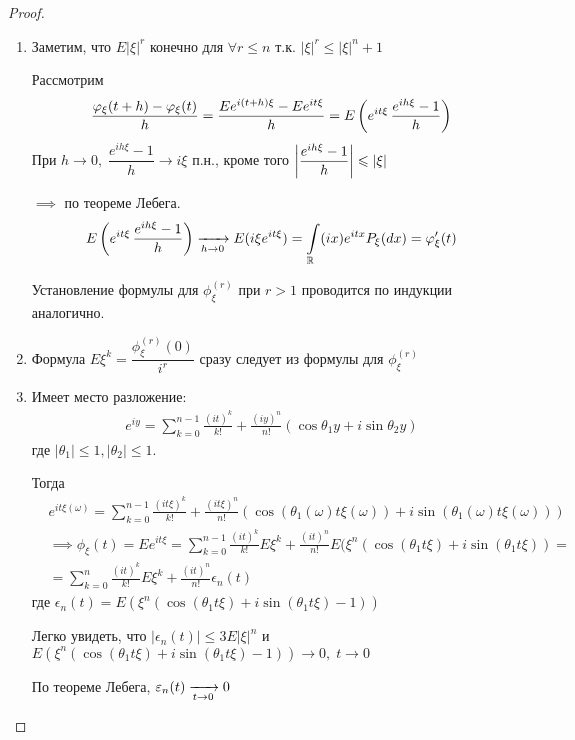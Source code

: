 \begin{proof}~

  \begin{enumerate}
    \item
      Заметим, что $E|\xi|^r$ конечно для $\forall r \leq n$ т.к. $|\xi|^r \leq |\xi|^n + 1$

      Рассмотрим 
      \begin{align*}
        \frac{\varphi_\xi(t + h) - \varphi_\xi (t)}{h} = \frac{E e^{i (t + h) \xi} - E e^{i t \xi}}{h}
        = E \left( e^{i t \xi}\, \frac{e^{i h \xi} - 1}{h} \right)
      \end{align*}
      При $h \to 0, \; \dfrac{e^{i h \xi} - 1}{h} \to i \xi$ п.н., 
      кроме того $\left |  \dfrac{e^{i h \xi} - 1}{h}  \right | \leqslant |\xi|$

      $\implies$ по теореме Лебега.
      \begin{align*}
        E \left( e^{i t \xi}\, \frac{e^{i h \xi} - 1}{h} \right) \xrightarrow[h \to 0]{} E(i \xi e^{i t \xi})
        = \int\limits_{\mathbb{R}} (i x) e^{i t x} P_\xi (dx) = \varphi'_{\xi} (t)
      \end{align*}

      Установление формулы для $\phi_{\xi}^{(r)}$ при $r > 1$ проводится по индукции аналогично.

    \item
      Формула $E \xi^k = \dfrac{\phi_{\xi}^{(r)} (0)}{i^r}$ сразу следует 
      из формулы для $\phi_\xi^{(r)}$

    \item
      Имеет место разложение:
      \begin{align*}
        e^{i y} = \sum_{k = 0}^{n - 1} \frac{(i t)^k}{k!} 
        + \frac{(i y)^n}{n!} (\cos \theta_1 y + i \sin \theta_2 y)
      \end{align*}
      где $|\theta_1| \leq 1, |\theta_2| \leq 1$.

      Тогда 
      \begin{align*}
        &e^{i t \xi(\omega)} = \sum_{k = 0}^{n - 1} \frac{(i t \xi)^k}{k!} 
        + \frac{(i t \xi)^n}{n!} (\cos (\theta_1(\omega) t \xi(\omega)) 
        + i \sin (\theta_1(\omega) t \xi(\omega)))\\
        &\implies \phi_{\xi} (t) = E e^{i t \xi} 
        = \sum_{k = 0}^{n - 1} \frac{(i t)^k}{k!} E \xi^k
        + \frac{(i t)^n}{n!} E (\xi^n (\cos (\theta_1 t \xi) + i \sin (\theta_1 t \xi)) =\\
        &= \sum_{k = 0}^{n} \frac{(i t)^k}{k!} E \xi^k + \frac{(i t)^n}{n!} \epsilon_n (t)
      \end{align*}
      где $\epsilon_n (t) = E (\xi^n (\cos (\theta_1 t \xi) + i \sin (\theta_1 t \xi) - 1))$
      
      Легко увидеть, что $|\epsilon_n (t)| \leq 3 E |\xi|^n$ и
      $E (\xi^n (\cos (\theta_1 t \xi) + i \sin (\theta_1 t \xi) - 1)) \to 0,\; t \to 0$

      По теореме Лебега, $\varepsilon_n(t) \xrightarrow[t \to 0]{} 0$
  \end{enumerate}
\end{proof}

